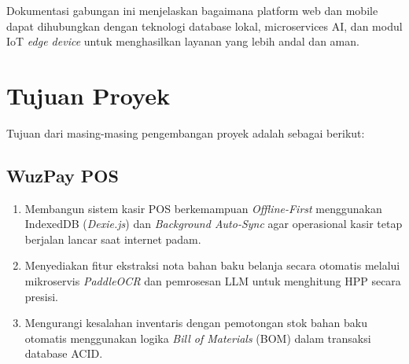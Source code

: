 \documentclass[12pt,titlepage,a4paper]{report}
\begin{document}
Dokumentasi gabungan ini menjelaskan bagaimana platform web dan mobile dapat dihubungkan dengan teknologi database lokal, microservices AI, dan modul IoT \textit{edge device} untuk menghasilkan layanan yang lebih andal dan aman.

\section{Tujuan Proyek}
Tujuan dari masing-masing pengembangan proyek adalah sebagai berikut:
\subsection{WuzPay POS}
\begin{enumerate}
    \item Membangun sistem kasir POS berkemampuan \textit{Offline-First} menggunakan IndexedDB (\textit{Dexie.js}) dan \textit{Background Auto-Sync} agar operasional kasir tetap berjalan lancar saat internet padam.
    \item Menyediakan fitur ekstraksi nota bahan baku belanja secara otomatis melalui mikroservis \textit{PaddleOCR} dan pemrosesan LLM untuk menghitung HPP secara presisi.
    \item Mengurangi kesalahan inventaris dengan pemotongan stok bahan baku otomatis menggunakan logika \textit{Bill of Materials} (BOM) dalam transaksi database ACID.
\end{enumerate}
\end{document}
